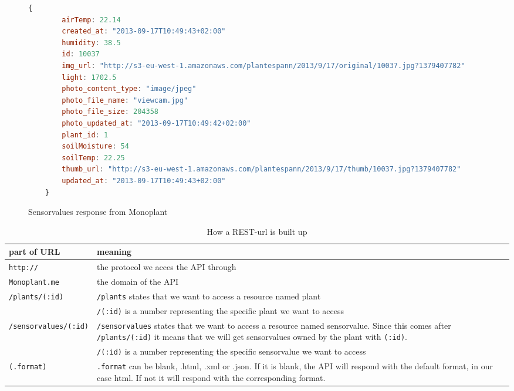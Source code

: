 \begin{figure}
    \begin{lstlisting}[language=javascript]
    {
        airTemp: 22.14
        created_at: "2013-09-17T10:49:43+02:00"
        humidity: 38.5
        id: 10037
        img_url: "http://s3-eu-west-1.amazonaws.com/plantespann/2013/9/17/original/10037.jpg?1379407782"
        light: 1702.5
        photo_content_type: "image/jpeg"
        photo_file_name: "viewcam.jpg"
        photo_file_size: 204358
        photo_updated_at: "2013-09-17T10:49:42+02:00"
        plant_id: 1
        soilMoisture: 54
        soilTemp: 22.25
        thumb_url: "http://s3-eu-west-1.amazonaws.com/plantespann/2013/9/17/thumb/10037.jpg?1379407782"
        updated_at: "2013-09-17T10:49:43+02:00"
    }
    \end{lstlisting}
    \caption{Sensorvalues response from Monoplant}
    \label{fig:sensorvaluesresponse}
\end{figure}



\bgroup
\def\arraystretch{1.8}	%
\begin{table}
	\centering
	\begin{tabular}{@{}lp{250pt}@{}} \toprule
		\textbf{part of URL}&	\textbf{meaning}\\ \midrule
		\texttt{http://}&	the protocol we acces the API through\\ 
		\texttt{Monoplant.me}&	the domain of the API\\ 
		\texttt{/plants/(:id)}&	\texttt{/plants} states that we want to access a resource named plant \\ &
		\texttt{/(:id)} is a number representing the specific plant we want to access\\ 
		\texttt{/sensorvalues/(:id)}&	\texttt{/sensorvalues} states that we want to access a resource named sensorvalue. Since this comes after \texttt{/plants/(:id)} it means that we will get sensorvalues owned by the plant with \texttt{(:id)}. \\ &
		\texttt{/(:id)} is a number representing the specific sensorvalue we want to access\\ 
		\texttt{(.format)}&	 \texttt{.format} can be blank, .html, .xml or .json. If it is blank, the API will respond with the default format, in our case html. If not it will respond with the corresponding format.\\ \bottomrule
	\end{tabular}
	\caption{How a REST-url is built up}
	\label{fig:RESTurl}
\end{table}
\egroup

